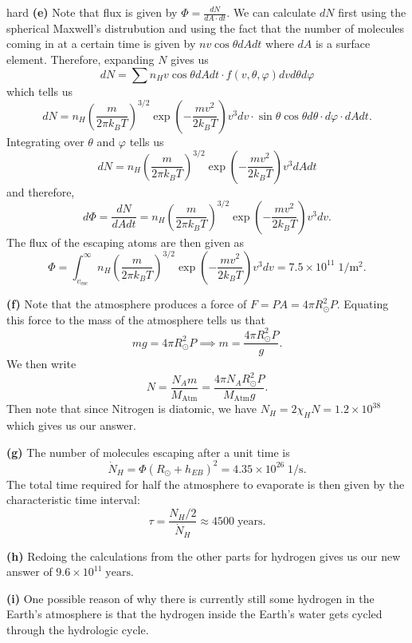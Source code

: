 \begin{solution}{hard}
\textbf{(e)} Note that flux is given by $\Phi = \frac{dN}{dA\cdot dt}$. We can calculate $dN$ first using the spherical Maxwell's distrubution and using the fact that the number of molecules coming in at a certain time is given by $nv\cos\theta dAdt$ where $dA$ is a surface element. Therefore, expanding $N$ gives us
\[dN = \sum n_H v\cos\theta dAdt \cdot f(v, \theta, \varphi) dv d\theta d\varphi\]
which tells us 
\[dN = n_H \left(\frac{m}{2\pi k_B T}\right)^{3/2} \exp \left(-\frac{mv^2}{2k_B T}\right) v^3 dv \cdot \sin\theta \cos\theta d\theta \cdot d\varphi \cdot dA dt.\]
Integrating over $\theta$ and $\varphi$ tells us 
\[dN = n_H \left(\frac{m}{2\pi k_B T}\right)^{3/2} \exp \left(-\frac{mv^2}{2k_B T}\right) v^3 dA dt\]
and therefore, 
\[d\Phi = \frac{dN}{dA dt} = n_H \left(\frac{m}{2\pi k_B T}\right)^{3/2} \exp \left(-\frac{mv^2}{2k_B T}\right) v^3 dv.\]
The flux of the escaping atoms are then given as 
\[\Phi = \int_{v_{\text{esc}}}^{\infty} n_H \left(\frac{m}{2\pi k_B T}\right)^{3/2} \exp \left(-\frac{mv^2}{2k_B T}\right) v^3 dv = \boxed{7.5\times 10^{11}\;\mathrm{1/m^2}}.\]
\vspace{3mm}

\textbf{(f)} Note that the atmosphere produces a force of $F = PA = 4\pi R_{\odot}^2 P$. Equating this force to the mass of the atmosphere tells us that 
\[mg = 4\pi R_{\odot}^2 P\implies m = \frac{4\pi R_{\odot}^2 P}{g}.\]
We then write 
\[N = \frac{N_A m}{M_{\text{Atm}}} = \frac{4\pi N_A R_{\odot}^2 P}{M_{\text{Atm}} g}.\]
Then note that since Nitrogen is diatomic, we have $N_H = 2\chi_H N = 1.2\times 10^{38}$ which gives us our answer.
\vspace{3mm}

\textbf{(g)} The number of molecules escaping after a unit time is 
\[\dot{N}_H = \Phi (R_{\odot} + h_{EB})^2 = 4.35\times 10^{26}\;\mathrm{1/s}.\]
The total time required for half the atmosphere to evaporate is then given by the characteristic time interval:
\[\tau = \frac{N_H/2}{\dot{N}_H} \approx \boxed{4500\;\mathrm{years}}.\]
\vspace{3mm}

\textbf{(h)} Redoing the calculations from the other parts for hydrogen gives us our new answer of $9.6\times 10^{11}\;\mathrm{years}.$
\vspace{3mm}

\textbf{(i)} One possible reason of why there is currently still some hydrogen in the Earth’s atmosphere is that the hydrogen inside the Earth's water gets cycled through the hydrologic cycle.

\end{solution}